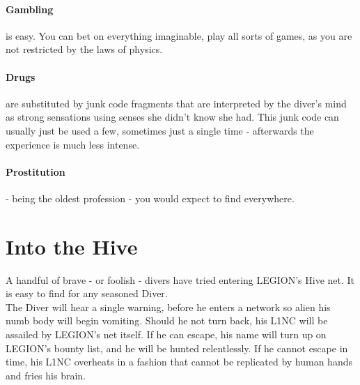 \paragraph{Gambling} is easy.
You can bet on everything imaginable, play all sorts of games, as you are not restricted by the laws of physics.
\paragraph{Drugs} are substituted by junk code fragments that are interpreted by the diver's mind as strong sensations using senses she didn't know she had. %
This junk code can usually just be used a few, sometimes just a single time
- afterwards the experience is much less intense.
\paragraph{Prostitution} - being the oldest profession - you would expect to find everywhere.


\section{Into the Hive}
A handful of brave - or foolish - divers have tried entering LEGION's Hive net.
It is easy to find for any seasoned Diver.
\\%
The Diver will hear a single warning, before he enters a network so alien his numb body will begin vomiting.
Should he not turn back, his L1NC will be assailed by LEGION's net itself.
If he can escape, his name will turn up on LEGION's bounty list, and he will be hunted relentlessly.
If he cannot escape in time, his L1NC overheats in a fashion that cannot be replicated by human hands and fries his brain.
